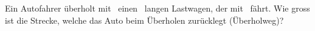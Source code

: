 Ein Autofahrer überholt mit \vAO\ einen \lLO\ langen Lastwagen, der mit \vLO\ fährt. Wie gross ist die Strecke, welche das Auto beim Überholen zurücklegt (Überholweg)?
